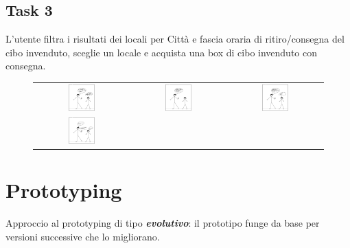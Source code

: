 \documentclass{article}
\begin{document}
\subsection{Task 3}
L'utente filtra i risultati dei locali per Città e fascia oraria di ritiro/consegna del cibo invenduto, sceglie un locale e acquista una box di cibo invenduto con consegna.
\begin{figure}[H]
    \centering
    \begin{tabular}{ccc}
        \includegraphics[width=0.3\textwidth]{Storyboard/task3-img/t3.1.png} &
        \includegraphics[width=0.3\textwidth]{Storyboard/task3-img/t3.2.png} &
        \includegraphics[width=0.3\textwidth]{Storyboard/task3-img/t3.3.png} \\
        \includegraphics[width=0.3\textwidth]{Storyboard/task3-img/t3.4.png} & & \\
    \end{tabular}
    \label{fig:task2}
\end{figure}

\section{Prototyping}

Approccio al prototyping di tipo \textit{\textbf{evolutivo}}: il prototipo funge da base per versioni successive che lo migliorano.
\end{document}

